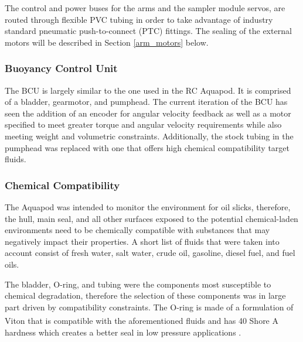 The control and power buses for the arms and the sampler module servos, are routed through flexible PVC tubing in order to take advantage of industry standard pneumatic push-to-connect (PTC) fittings. The sealing of the external motors will be described in Section \ref{arm_motors} below. 

\subsubsection{Buoyancy Control Unit}
The BCU is largely similar to the one used in the RC Aquapod. It is comprised of a bladder, gearmotor, and pumphead.  The current iteration of the BCU has seen the addition of an encoder for angular velocity feedback as well as a motor specified to meet greater torque and angular velocity requirements while also meeting weight and volumetric constraints. Additionally, the stock tubing in the pumphead was replaced with one that offers high chemical compatibility target fluids.

\subsubsection{Chemical Compatibility}
The Aquapod was intended to monitor the environment for oil slicks, therefore, the hull, main seal, and all other surfaces exposed to the potential chemical-laden environments need to be chemically compatible with substances that may negatively impact their properties. A short list of fluids that were taken into account consist of fresh water, salt water, crude oil, gasoline, diesel fuel, and fuel oils.


The bladder, O-ring, and tubing were the components most susceptible to chemical degradation, therefore the selection of these components was in large part driven by compatibility constraints. The O-ring is made of a formulation of Viton\textsuperscript{\textregistered} that is compatible with the aforementioned fluids and has 40 Shore A hardness which creates a better seal in low pressure applications \cite{Parker-Hannifin2007}.


